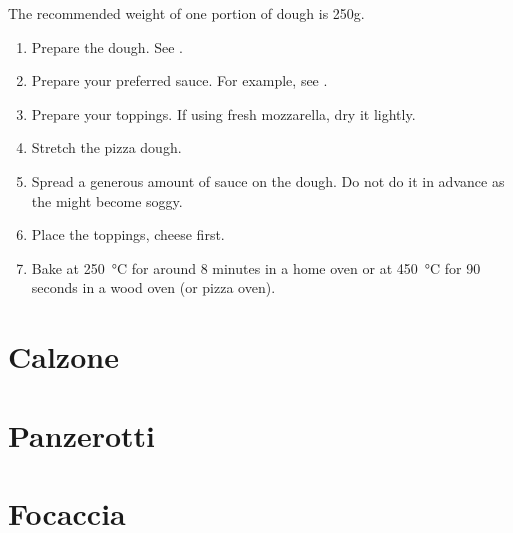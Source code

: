 The recommended weight of one portion of dough is 250g.

\begin{enumerate}
  \item Prepare the dough. See .
  \item Prepare your preferred sauce. For example, see .
  \item Prepare your toppings. If using fresh mozzarella, dry it lightly.
  \item Stretch the pizza dough.
  \item Spread a generous amount of sauce on the dough. Do not do it in advance
    as the might become soggy.
  \item Place the toppings, cheese first.
  \item Bake at \SI{250}{\celsius} for around 8 minutes in a home oven or at
    \SI{450}{\celsius} for 90 seconds in a wood oven (or pizza oven).
\end{enumerate}

\section{Calzone}
\section{Panzerotti}
\section{Focaccia}

